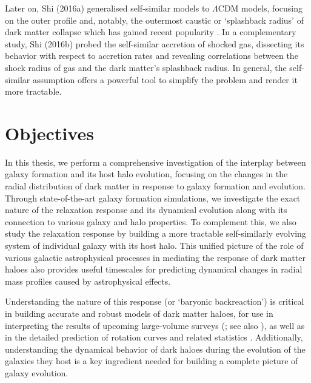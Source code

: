 Later on, Shi (2016a) \cite{2016ShiDMLamCDM} generalised self-similar models to $\Lambda$CDM models, focusing on the outer profile and, notably, the outermost caustic or `splashback radius' of dark matter collapse which has gained recent popularity \cite{2014DiemerKrastov,2014AdhikariDalalChamberlain,2018Changetal_DES_splashback}.
In a complementary study, Shi (2016b) \cite{2016ShiICM} probed the self-similar accretion of shocked gas, dissecting its behavior with respect to accretion rates and revealing correlations between the shock radius of gas and the dark matter's splashback radius. In general, the self-similar assumption offers a powerful tool to simplify the problem and render it more tractable.



\section{Objectives}

In this thesis, we perform a comprehensive investigation of the interplay between galaxy formation and its host halo evolution, focusing on the changes in the radial distribution of dark matter in response to galaxy formation and evolution. Through state-of-the-art galaxy formation simulations, we investigate the exact nature of the relaxation response and its dynamical evolution along with its connection to various galaxy and halo properties. To complement this, we also study the relaxation response by building a more tractable self-similarly evolving system of individual galaxy with its host halo. This unified picture of the role of various galactic astrophysical processes in mediating the response of dark matter haloes also provides useful timescales for predicting dynamical changes in radial mass profiles caused by astrophysical effects.

Understanding the nature of this response (or `baryonic backreaction') is critical in building accurate and robust models of dark matter haloes, for use in interpreting the results of upcoming large-volume surveys (\citealp{2015JCAP...12..049S,2018MNRAS.480.3962C,2021MNRAS.503.3596A}; see also \citealp{velliscig+14,hwvh15,mead+15}), as well as in the detailed prediction of rotation curves and related statistics \citep{2021MNRAS.507..632P,2022MNRAS.517..130P}. Additionally, understanding the dynamical behavior of dark haloes during the evolution of the galaxies they host is a key ingredient needed for building a complete picture of galaxy evolution.

